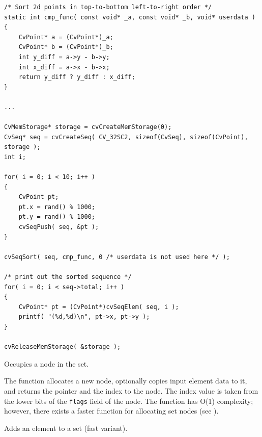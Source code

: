 \begin{lstlisting}
/* Sort 2d points in top-to-bottom left-to-right order */
static int cmp_func( const void* _a, const void* _b, void* userdata )
{
    CvPoint* a = (CvPoint*)_a;
    CvPoint* b = (CvPoint*)_b;
    int y_diff = a->y - b->y;
    int x_diff = a->x - b->x;
    return y_diff ? y_diff : x_diff;
}

...

CvMemStorage* storage = cvCreateMemStorage(0);
CvSeq* seq = cvCreateSeq( CV_32SC2, sizeof(CvSeq), sizeof(CvPoint), storage );
int i;

for( i = 0; i < 10; i++ )
{
    CvPoint pt;
    pt.x = rand() % 1000;
    pt.y = rand() % 1000;
    cvSeqPush( seq, &pt );
}

cvSeqSort( seq, cmp_func, 0 /* userdata is not used here */ );

/* print out the sorted sequence */
for( i = 0; i < seq->total; i++ )
{
    CvPoint* pt = (CvPoint*)cvSeqElem( seq, i );
    printf( "(%d,%d)\n", pt->x, pt->y );
}

cvReleaseMemStorage( &storage );
\end{lstlisting}


Occupies a node in the set.


\begin{description}
\end{description}

The function allocates a new node, optionally copies
input element data to it, and returns the pointer and the index to the
node. The index value is taken from the lower bits of the \texttt{flags}
field of the node. The function has O(1) complexity; however, there exists
a faster function for allocating set nodes (see ).

Adds an element to a set (fast variant).


